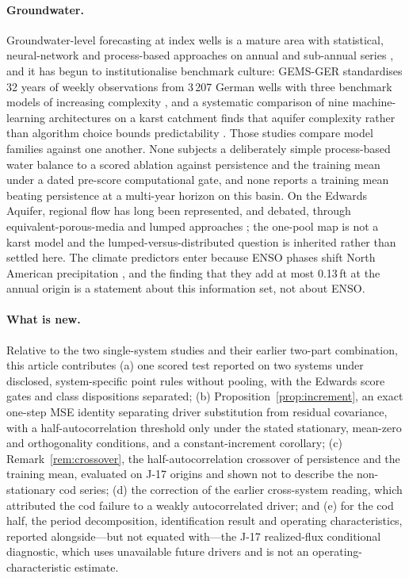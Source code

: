 \documentclass[preprint,11pt,authoryear]{elsarticle}
\theoremstyle{definition}
\theoremstyle{remark}
\begin{document}
\paragraph{Groundwater.} Groundwater-level forecasting at index wells is a mature area with statistical, neural-network and process-based approaches on annual and sub-annual series \citep{Daliakopoulos2005,AdamowskiChan2011}, and it has begun to institutionalise benchmark culture: GEMS-GER standardises 32 years of weekly observations from 3\,207 German wells with three benchmark models of increasing complexity \citep{Ohmer2026}, and a systematic comparison of nine machine-learning architectures on a karst catchment finds that aquifer complexity rather than algorithm choice bounds predictability \citep{Zhu2026}. Those studies compare model families against one another. None subjects a deliberately simple process-based water balance to a scored ablation against persistence and the training mean under a dated pre-score computational gate, and none reports a training mean beating persistence at a multi-year horizon on this basin. On the Edwards Aquifer, regional flow has long been represented, and debated, through equivalent-porous-media and lumped approaches \citep{Scanlon2003}; the one-pool map is not a karst model and the lumped-versus-distributed question is inherited rather than settled here. The climate predictors enter because ENSO phases shift North American precipitation \citep{Ropelewski1986}, and the finding that they add at most 0.13\,ft at the annual origin is a statement about this information set, not about ENSO.

\paragraph{What is new.} Relative to the two single-system studies and their earlier two-part combination, this article contributes (a) one scored test reported on two systems under disclosed, system-specific point rules without pooling, with the Edwards score gates and class dispositions separated; (b) Proposition~\ref{prop:increment}, an exact one-step MSE identity separating driver substitution from residual covariance, with a half-autocorrelation threshold only under the stated stationary, mean-zero and orthogonality conditions, and a constant-increment corollary; (c) Remark~\ref{rem:crossover}, the half-autocorrelation crossover of persistence and the training mean, evaluated on J-17 origins and shown not to describe the non-stationary cod series; (d) the correction of the earlier cross-system reading, which attributed the cod failure to a weakly autocorrelated driver; and (e) for the cod half, the period decomposition, identification result and operating characteristics, reported alongside—but not equated with—the J-17 realized-flux conditional diagnostic, which uses unavailable future drivers and is not an operating-characteristic estimate.
\FloatBarrier
\end{document}

